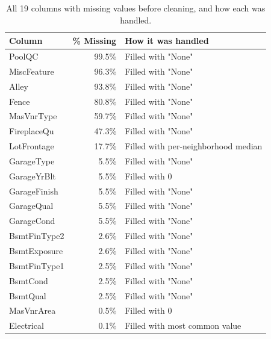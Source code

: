 \documentclass[11pt]{article}
\begin{document}
\begin{table}[H]
    \centering
    \caption{All 19 columns with missing values before cleaning, and how each was handled.}
    \begin{tabular}{lrl}
        \toprule
        \textbf{Column} & \textbf{\% Missing} & \textbf{How it was handled} \\
        \midrule
        PoolQC       & 99.5\% & Filled with "None" \\
        MiscFeature  & 96.3\% & Filled with "None" \\
        Alley        & 93.8\% & Filled with "None" \\
        Fence        & 80.8\% & Filled with "None" \\
        MasVnrType   & 59.7\% & Filled with "None" \\
        FireplaceQu  & 47.3\% & Filled with "None" \\
        LotFrontage  & 17.7\% & Filled with per-neighborhood median \\
        GarageType   & 5.5\%  & Filled with "None" \\
        GarageYrBlt  & 5.5\%  & Filled with 0 \\
        GarageFinish & 5.5\%  & Filled with "None" \\
        GarageQual   & 5.5\%  & Filled with "None" \\
        GarageCond   & 5.5\%  & Filled with "None" \\
        BsmtFinType2 & 2.6\%  & Filled with "None" \\
        BsmtExposure & 2.6\%  & Filled with "None" \\
        BsmtFinType1 & 2.5\%  & Filled with "None" \\
        BsmtCond     & 2.5\%  & Filled with "None" \\
        BsmtQual     & 2.5\%  & Filled with "None" \\
        MasVnrArea   & 0.5\%  & Filled with 0 \\
        Electrical   & 0.1\%  & Filled with most common value \\
        \bottomrule
    \end{tabular}
\end{table}
\end{document}
